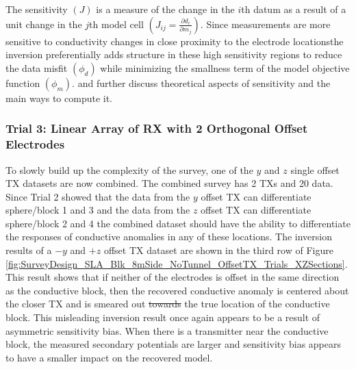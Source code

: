\documentclass[preprint,authoryear,12pt]{elsarticle}
\providecommand{\DIFaddtex}[1]{{\protect\color{blue}\uwave{#1}}} %
\providecommand{\DIFdeltex}[1]{{\protect\color{red}\sout{#1}}}                      %
\providecommand{\DIFaddbegin}{} %
\providecommand{\DIFaddend}{} %
\providecommand{\DIFdelbegin}{} %
\providecommand{\DIFdelend}{} %
\providecommand{\DIFadd}[1]{\texorpdfstring{\DIFaddtex{#1}}{#1}} %
\providecommand{\DIFdel}[1]{\texorpdfstring{\DIFdeltex{#1}}{}} %
\begin{document}
The sensitivity $\left( J \right)$ is a measure of the change in the $i$th datum as a result of a unit change in the $j$th model cell $\left( J_{ij} = \frac{\partial d_i}{\partial m_j} \right)$. Since measurements are more sensitive to conductivity changes in close proximity to the electrode locations\DIFaddbegin \DIFadd{, }\DIFaddend the inversion preferentially adds structure in these high sensitivity regions to reduce the data misfit $\left( \phi_d \right)$ while minimizing the smallness term of the model objective function $\left( \phi_m \right)$. \citet{McGILLIVRAY1990} and \citet{Spitzer1998} further discuss theoretical aspects of sensitivity and the main ways to compute it.


\DIFdelbegin %


\DIFdelend \subsubsection{Trial 3: Linear Array of RX with 2 Orthogonal Offset Electrodes}
\label{sec:TheoreticalAnalysis_Trial3_2OrthogElecOffset}

To slowly build up the complexity of the survey, one of the $y$ and $z$ single offset TX datasets are now combined. The combined survey has 2 TXs and 20 data. Since Trial 2 showed that the data from the $y$ offset TX can differentiate sphere/block 1 and 3 and the data from the $z$ offset TX can differentiate sphere/block 2 and 4 the combined dataset should have the ability to differentiate the responses of conductive anomalies in any of these locations. The inversion results of a \DIFdelbegin \DIFdel{$-y$ }\DIFdelend \DIFaddbegin \DIFadd{-$y$ }\DIFaddend and $+z$ offset TX dataset are shown in the third row of Figure \ref{fig:SurveyDesign_SLA_Blk_8mSide_NoTunnel_OffsetTX_Trials_XZSections}. This result shows that if neither of the electrodes is offset in the same direction as the conductive block, then the recovered conductive anomaly is centered about the closer TX and is smeared out \DIFdelbegin \DIFdel{towards }\DIFdelend \DIFaddbegin \DIFadd{toward }\DIFaddend the true location of the conductive block. This misleading inversion result once again appears to be a result of asymmetric sensitivity bias. When there is a transmitter near the conductive block, the measured secondary potentials are larger and sensitivity bias appears to have a smaller impact on the recovered model.
\end{document}
